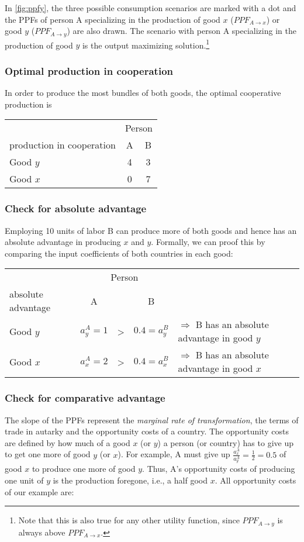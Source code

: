 In \autoref{fig:ppfy}, the three possible consumption scenarios are marked with a dot and the PPFs of person A specializing in the production of good $x$ ($PPF_{A\rightarrow x}$) or good $y$ ($PPF_{A\rightarrow y}$) are also drawn. 
The scenario with person A specializing in the production of good $y$ is the output maximizing solution.\footnote{Note that this is also true for any other utility function, since $PPF_{A\rightarrow y}$ is always above $PPF_{A\rightarrow x}$.}

\subsubsection{Optimal production in cooperation} In order to produce the most bundles of both goods, the optimal cooperative production is 
				\begin{center}
	\begin{tabular}{lcc}\toprule
		&\multicolumn{2}{c}{Person} \\\cmidrule{2-3}
		production in cooperation	&A &B \\		\midrule
		Good $y$ & 4 & 3\\
		Good $x$ & 0 & 7 \\\bottomrule
	\end{tabular}
\end{center}\medskip


\subsubsection{Check for absolute advantage}
Employing 10 units of labor B can produce more of both goods and hence has an absolute advantage in producing $x$ and $y$. Formally, we can proof this by comparing the input coefficients of both countries in each good: 
\begin{center}
	\begin{tabular}{lcccl}\toprule
		&\multicolumn{3}{c}{Person}&\\\cmidrule{2-4}
		absolute advantage	&A & &B& \\		\midrule
		Good $y$ & $a_y^A=1$ & > & $0.4=a_y^B$ & $\Rightarrow$ B has an absolute advantage in good $y$\\
		Good $x$ & $a_x^A=2$ & > & $0.4=a_x^B$ & $\Rightarrow$ B has an absolute advantage in good $x$ \\\bottomrule
	\end{tabular}
\end{center}\medskip

\subsubsection{Check for comparative advantage}
	The slope of the PPFs represent the \textit{marginal rate of transformation}, the terms of trade in autarky and the opportunity costs of a country. The opportunity costs are defined by how much of a good $x$ (or $y$) a person (or country) has to give up to get one more of good $y$ (or $x$). For example, A must give up $\frac{a_x^A}{a_y^A}=\frac{1}{2}=0.5$ of good $x$ to produce one more of good $y$. Thus, A's opportunity costs of producing one unit of $y$ is the production foregone, i.e., a half good $x$. 
	All opportunity costs of our example are:
	

